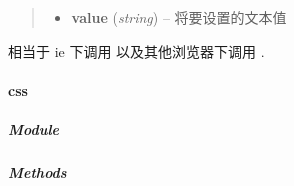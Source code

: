 \documentclass[letterpaper,10pt,english]{sphinxmanual}
\begin{document}
\begin{fulllineitems}
\begin{quote}
\begin{description}
\begin{itemize}
\item {}
\textbf{value} (\emph{string}) -- 将要设置的文本值

\end{itemize}

\end{description}\end{quote}

\begin{center}相当于 ie 下调用  以及其他浏览器下调用  .
\end{center}
\end{fulllineitems}



\paragraph{css}
\label{api/core/dom/css::doc}\label{api/core/dom/css:css}

\subparagraph{Module}
\label{api/core/dom/css:module}\begin{quote}

{\hyperref[api/core/dom/index:module-DOM]{}}
\end{quote}


\subparagraph{Methods}
\label{api/core/dom/css:methods}
\end{document}
